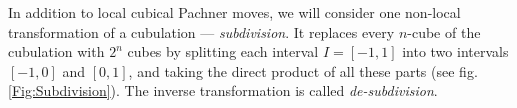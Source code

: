 \documentclass{amsart}
\newtheorem{remark}{Remark}
\begin{document}

In addition to local cubical Pachner moves, we will consider one non-local transformation of a cubulation --- \emph{subdivision}. It replaces every $n$-cube of the cubulation with $2^n$ cubes by splitting each interval $I = [-1, 1]$ into two intervals $[-1, 0]$ and $[0, 1]$, and taking the direct product of all these parts (see fig. \ref{Fig:Subdivision}). The inverse transformation is called \emph{de-subdivision}.
\end{document}
